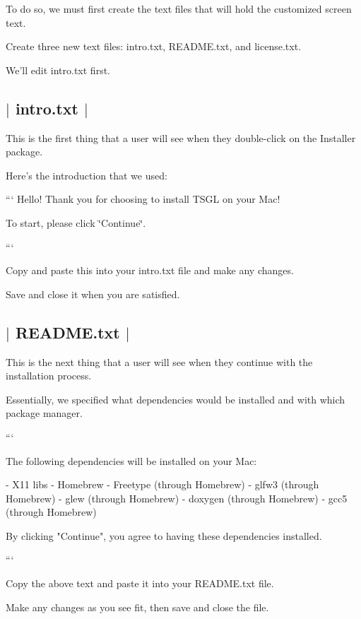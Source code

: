 To do so, we must first create the text files that will hold the customized screen text.

Create three new text files\-: {\ttfamily intro.\-txt}, {\ttfamily R\-E\-A\-D\-M\-E.\-txt}, and {\ttfamily license.\-txt}.

We'll edit {\ttfamily intro.\-txt} first. 

 \subsection*{$\vert$ {\ttfamily intro.\-txt} $\vert$ }

This is the first thing that a user will see when they double-\/click on the Installer package.

Here's the introduction that we used\-:

``` Hello! Thank you for choosing to install T\-S\-G\-L on your Mac!

To start, please click \char`\"{}\-Continue\char`\"{}.

```

Copy and paste this into your {\ttfamily intro.\-txt} file and make any changes.

Save and close it when you are satisfied. 

 \subsection*{$\vert$ {\ttfamily R\-E\-A\-D\-M\-E.\-txt} $\vert$ }

This is the next thing that a user will see when they continue with the installation process.

Essentially, we specified what dependencies would be installed and with which package manager.

``` \begin{DoxyVerb}The following dependencies will be installed on your Mac:

    - X11 libs
    - Homebrew
    - Freetype (through Homebrew)
    - glfw3 (through Homebrew)
    - glew (through Homebrew)
    - doxygen (through Homebrew)
    - gcc5 (through Homebrew)

By clicking "Continue", you agree to having these dependencies installed. 
\end{DoxyVerb}


```

Copy the above text and paste it into your {\ttfamily R\-E\-A\-D\-M\-E.\-txt} file.

Make any changes as you see fit, then save and close the file. 

